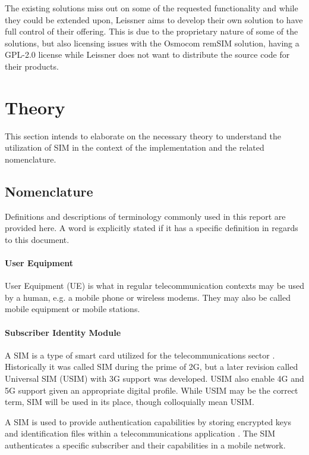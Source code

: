 The existing solutions miss out on some of the requested
functionality and while they could be extended upon, Leissner aims
to develop their own solution to have full control of their
offering. This is due to the proprietary nature of some of the
solutions, but also licensing issues with the Osmocom remSIM
solution, having a GPL-2.0 license while Leissner does not want to
distribute the source code for their products.

\section{Theory}

This section intends to elaborate on the necessary theory to
understand the utilization of SIM in the context of the
implementation and the related nomenclature.

\subsection{Nomenclature}

Definitions and descriptions of terminology commonly used in this
report are provided here. A word is explicitly stated if it has a
specific definition in regards to this document.

\paragraph{User Equipment}

User Equipment (UE) is what in regular telecommunication contexts
may be used by a human, e.g. a mobile phone or wireless modems.
They may also be called mobile equipment or mobile stations.

\paragraph{Subscriber Identity Module}

A SIM is a type of smart card utilized for the telecommunications
sector \cite{etsi-ts-131-102}. Historically it was called SIM
during the prime of 2G, but a later revision called Universal SIM
(USIM) with 3G \cite{etsi-ts-131-102} support was developed. USIM
also enable 4G and 5G support given an appropriate digital profile.
While USIM may be the correct term, SIM will be used in its place,
though colloquially mean USIM.

A SIM is used to provide authentication capabilities by storing
encrypted keys and identification files within a telecommunications
application \cite{etsi-ts-131-102}. The SIM authenticates a
specific subscriber and their capabilities in a mobile network.

